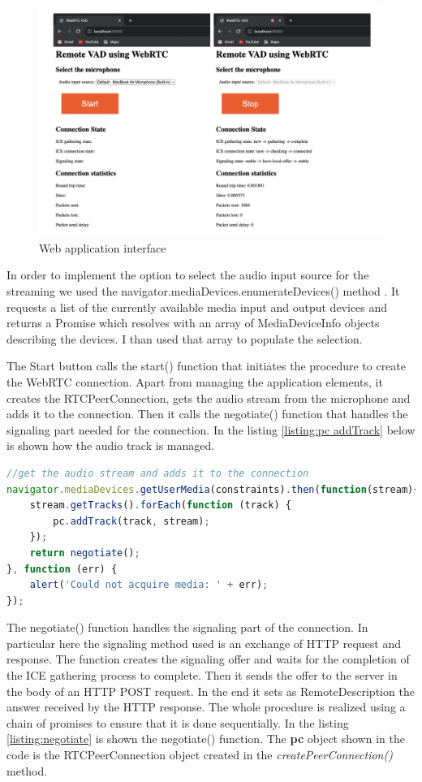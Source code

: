 \documentclass[../main.tex]{subfiles}
\begin{document}
\begin{figure}[ht]
    \centering
    \includegraphics[width=\textwidth]{images/Web interface.png}
    \caption{Web application interface}
    \label{fig:web interface}
\end{figure}

In order to implement the option to select the audio input source for the streaming we used the navigator.mediaDevices.enumerateDevices() method . It requests a list of the currently available media input and output devices and returns a Promise which resolves with an array of MediaDeviceInfo objects describing the devices. I than used that array to populate the selection.

The Start button calls the start() function that initiates the procedure to create the WebRTC connection. Apart from managing the application elements, it creates the RTCPeerConnection, gets the audio stream from the microphone and adds it to the connection. Then it calls the negotiate() function that handles the signaling part needed for the connection.  In the listing \ref{listing:pc addTrack} below is shown how the audio track is managed.

\begin{lstlisting}[language=JavaScript, caption=Audio stream handling]
//get the audio stream and adds it to the connection
navigator.mediaDevices.getUserMedia(constraints).then(function(stream){
    stream.getTracks().forEach(function (track) {
        pc.addTrack(track, stream);
    });
    return negotiate();
}, function (err) {
    alert('Could not acquire media: ' + err);
}); 
\end{lstlisting}
\label{listing:pc addTrack}

The negotiate() function handles the signaling part of the connection. In particular here the signaling method used is an exchange of HTTP request and response. The function creates the signaling offer and waits for the completion of the ICE gathering process to complete. Then it sends the offer to the server in the body of an HTTP POST request. In the end it sets as RemoteDescription the answer received by the HTTP response. The whole procedure is realized using a chain of promises to ensure that it is done sequentially. In the listing \ref{listing:negotiate} is shown the negotiate() function. The \textbf{pc} object shown in the code is the RTCPeerConnection object created in the \textit{createPeerConnection()} method.
\end{document}
